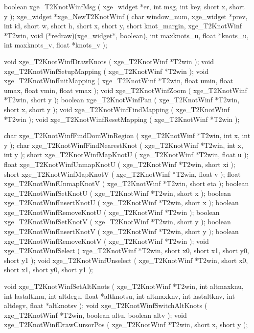 \begin{listingC}
boolean xge_T2KnotWinfMsg ( xge_widget *er,
                            int msg, int key, short x, short y );
xge_widget *xge_NewT2KnotWinf ( char window_num, xge_widget *prev,
                                int id,
                                short w, short h, short x, short y,
                                short knot_margin,
                                xge_T2KnotWinf *T2win,
                                void (*redraw)(xge_widget*, boolean),
                                int maxknots_u, float *knots_u,
                                int maxknots_v, float *knots_v );

void xge_T2KnotWinfDrawKnots ( xge_T2KnotWinf *T2win );
void xge_T2KnotWinfSetupMapping ( xge_T2KnotWinf *T2win );
void xge_T2KnotWinfInitMapping ( xge_T2KnotWinf *T2win,
                     float umin, float umax, float vmin, float vmax );
void xge_T2KnotWinfZoom ( xge_T2KnotWinf *T2win, short y );
boolean xge_T2KnotWinfPan ( xge_T2KnotWinf *T2win,
                            short x, short y );
void xge_T2KnotWinfFindMapping ( xge_T2KnotWinf *T2win );
void xge_T2KnotWinfResetMapping ( xge_T2KnotWinf *T2win );

char xge_T2KnotWinfFindDomWinRegion ( xge_T2KnotWinf *T2win,
                                      int x, int y );
char xge_T2KnotWinfFindNearestKnot ( xge_T2KnotWinf *T2win,
                                     int x, int y );
short xge_T2KnotWinfMapKnotU ( xge_T2KnotWinf *T2win, float u );
float xge_T2KnotWinfUnmapKnotU ( xge_T2KnotWinf *T2win, short xi );
short xge_T2KnotWinfMapKnotV ( xge_T2KnotWinf *T2win, float v );
float xge_T2KnotWinfUnmapKnotV ( xge_T2KnotWinf *T2win, short eta );
boolean xge_T2KnotWinfSetKnotU ( xge_T2KnotWinf *T2win, short x );
boolean xge_T2KnotWinfInsertKnotU ( xge_T2KnotWinf *T2win,
                                    short x );
boolean xge_T2KnotWinfRemoveKnotU ( xge_T2KnotWinf *T2win );
boolean xge_T2KnotWinfSetKnotV ( xge_T2KnotWinf *T2win, short y );
boolean xge_T2KnotWinfInsertKnotV ( xge_T2KnotWinf *T2win,
                                    short y );
boolean xge_T2KnotWinfRemoveKnotV ( xge_T2KnotWinf *T2win );
void xge_T2KnotWinfSelect ( xge_T2KnotWinf *T2win,
                            short x0, short x1, short y0, short y1 );
void xge_T2KnotWinfUnselect ( xge_T2KnotWinf *T2win,
                              short x0, short x1, short y0, short y1 );

void xge_T2KnotWinfSetAltKnots ( xge_T2KnotWinf *T2win,
               int altmaxknu, int lastaltknu, int altdegu,
               float *altknotsu,
               int altmaxknv, int lastaltknv, int altdegv,
               float *altknotsv );
void xge_T2KnotWinfSwitchAltKnots ( xge_T2KnotWinf *T2win,
               boolean altu, boolean altv );
void xge_T2KnotWinfDrawCursorPos ( xge_T2KnotWinf *T2win,
                                   short x, short y );
\end{listingC}


